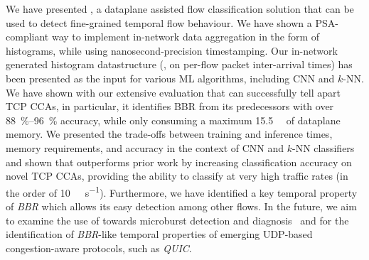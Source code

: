 We have presented \seidr{}, a dataplane assisted flow classification solution that can be used to detect fine-grained temporal flow behaviour. We have shown a PSA-compliant way to implement in-network data aggregation in the form of histograms, while using nanosecond-precision timestamping. Our in-network generated histogram datastructure (\eg, on per-flow packet inter-arrival times) has been presented as the input for various ML algorithms, including CNN and $k$-NN. We have shown with our extensive evaluation that \seidr{} can successfully tell apart TCP CCAs, in particular, it identifies BBR from its predecessors with over \SIrange{88}{96}{\percent} accuracy, while only consuming a maximum \SI{15.5}{\mebi\byte} of dataplane memory. We presented the trade-offs between training and inference times, memory requirements, and accuracy in the context of CNN and $k$-NN classifiers and shown that \seidr{} outperforms prior work by increasing classification accuracy on novel TCP CCAs, providing the ability to classify at very high traffic rates (in the order of \SI{10}{\tera\bit\per\second}).
Furthermore, we have identified a key temporal property of \emph{BBR} which allows its easy detection among other flows.
In the future, we aim to examine the use of \seidr{} towards microburst detection and diagnosis~\parencite{DBLP:conf/sigcomm/ChenFKRR18} and for the identification of \emph{BBR}-like temporal properties of emerging UDP-based congestion-aware protocols, such as \emph{QUIC}.%